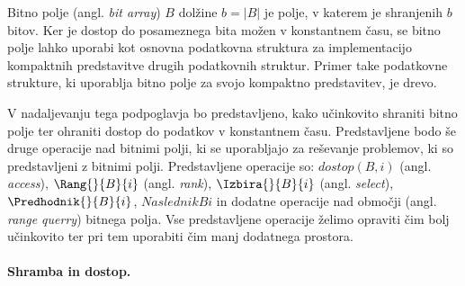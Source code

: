 Bitno polje (angl. \textit{bit array}) $B$ dolžine $b=|B|$ je polje, v katerem je shranjenih $b$ bitov. Ker je dostop do posameznega bita možen v konstantnem času, se bitno polje lahko uporabi kot osnovna podatkovna struktura za implementacijo kompaktnih predstavitve drugih podatkovnih struktur. Primer take podatkovne strukture, ki uporablja bitno polje za svojo kompaktno predstavitev, je drevo.

V nadaljevanju tega podpoglavja bo predstavljeno, kako učinkovito shraniti bitno polje ter ohraniti dostop do podatkov v konstantnem času. Predstavljene bodo še druge operacije nad bitnimi polji, ki se uporabljajo za reševanje problemov, ki so predstavljeni z bitnimi polji. Predstavljene operacije so: $dostop(B,i)$ (angl. \textit{access}), $\Rang{}{B}{i}$ (angl. \textit{rank}), $\Izbira{}{B}{i}$ (angl. \textit{select}), $\Predhodnik{}{B}{i}$, $Naslednik{}{B}{i}$ in dodatne operacije nad območji (angl. \textit{range querry}) bitnega polja. Vse predstavljene operacije želimo opraviti čim bolj učinkovito ter pri tem uporabiti čim manj dodatnega prostora.

%

\paragraph{Shramba in dostop.}

